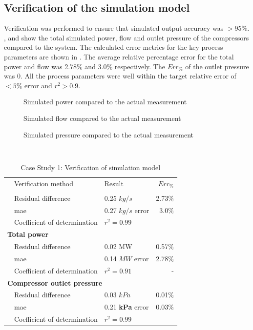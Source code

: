 \subsection{Verification of the simulation model}
Verification was performed to ensure that simulated output accuracy was $>95$\%. ,  and  show the total simulated power, flow and outlet pressure of the compressors compared to the system. The calculated error metrics for the key process parameters are shown in . The average relative percentage error for the total power and flow was 2.78\% and 3.0\% respectively. The $Err_{\%}$ of the outlet pressure was 0. All the process parameters were well within the target relative error of $ <5\% $ error and $r^2 > 0.9$. 
\begin{figure}[h!]
	\centering
	
	\caption{Simulated power compared to the actual measurement}
	\label{fig: Verification power Beatrix}
\end{figure}
\begin{figure}[h!]
	\centering
	
	\caption{Simulated flow compared to the actual measurement}
	\label{fig: Verification flow Beatrix}
\end{figure}
\begin{figure}[h!]
	\centering
	
	\caption{Simulated pressure compared to the actual measurement}
	\label{fig: Verification Pressure Beatrix}
\end{figure}\\
 \begin{table}[h!]
 	\caption{Case Study 1: Verification of simulation model}
	\centering
	\begin{tabular}{p{0.5cm}p{8cm}p{5cm}r}
		\hline
		&Verification method & Result & $Err_{\%}$\\
		\hhline{====}
		\multicolumn{4}{l}{\textbf{ Total Flow}}\\
		&Residual difference  & 0.25 $kg/s$ & 2.73\% \\
		&\gls{mae} 					 & 0.27 $kg/s$ error & 3.0\% \\
		&Coefficient of determination & $r^2 =0.99$ & -\\ 
		\multicolumn{4}{l}{\textbf{ Total power}}\\
		&Residual difference  & 0.02 MW & 0.57\% \\
		&\gls{mae} 					 & 0.14 $MW$ error & 2.78\% \\
		&Coefficient of determination & $r^2 =0.91$ & -\\ 
		\multicolumn{4}{l}{\textbf{ Compressor outlet pressure}}\\
		&Residual difference  &0.03 $kPa$ & 0.01\% \\
		&\gls{mae} 					 & 0.21 \textbf{kPa} error & 0.03\% \\
		&Coefficient of determination & $r^2 =0.99$ & -\\
		\hline
	\end{tabular} 
	\label{Beet verification table}
\end{table}
